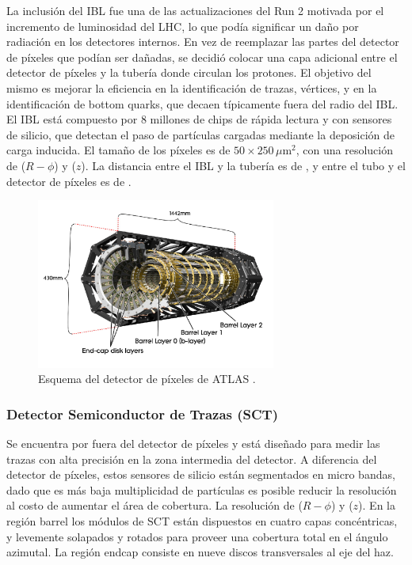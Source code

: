 La inclusión del IBL fue una de las actualizaciones del Run 2 motivada por el incremento de luminosidad del LHC, lo que podía significar un daño por radiación en los detectores internos. En vez de reemplazar las partes del detector de píxeles que podían ser dañadas, se decidió colocar una capa adicional entre el detector de píxeles y la tubería donde circulan los protones. El objetivo del mismo es mejorar la eficiencia en la identificación de trazas, vértices, y en la identificación de bottom quarks, que decaen típicamente fuera del radio del IBL. El IBL está compuesto por $8$ millones de chips de rápida lectura y con sensores de silicio, que detectan el paso de partículas cargadas mediante la deposición de carga inducida. El tamaño de los píxeles es de $50\times250\,\mu$m$^{2}$, con una resolución de  ($R-\phi$) y  ($z$). La distancia entre el IBL y la tubería es de , y entre el tubo y el detector de píxeles es de . 


\begin{figure}
  \centering
  \includegraphics[width=0.7\textwidth]{images/lhc/pixel_3.png}
  \caption{Esquema del detector de píxeles de ATLAS \cite{Takubo:1957197}.}
  \label{fig:pixel_3}
\end{figure}

\subsubsection{Detector Semiconductor de Trazas (SCT)}

Se encuentra por fuera del detector de píxeles y está diseñado para medir las trazas con alta precisión en la zona intermedia del detector. A diferencia del detector de píxeles, estos sensores de silicio están segmentados en micro bandas, dado que es más baja multiplicidad de partículas es posible reducir la resolución al costo de aumentar el área de cobertura. La resolución de  ($R-\phi$) y  ($z$). En la región barrel los módulos de SCT están dispuestos en cuatro capas concéntricas, y levemente solapados y rotados para proveer una cobertura total en el ángulo azimutal. La región endcap consiste en nueve discos transversales al eje del haz.


